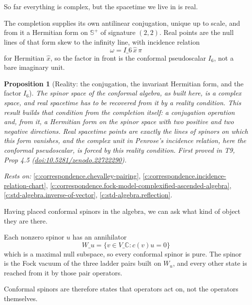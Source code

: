 \documentclass[11pt]{article}
\newtheorem{proposition}[theorem]{Proposition}
\theoremstyle{definition}
\theoremstyle{plain}
\providecommand{\C}{}\renewcommand{\C}{\mathbb{C}}
\providecommand{\CS}{}\renewcommand{\CS}{{\mathbb{S}^{+}}}
\begin{document}
So far everything is complex, but the spacetime we live in is real.

The completion supplies its own antilinear conjugation, unique up to scale, and from it a Hermitian form on $\CS$ of signature $(2,2)$. Real points are the null lines of that form skew to the infinity line, with incidence relation \[ \omega = I\_6\, \hat x\, \pi \] for Hermitian $\hat x$, so the factor in front is the conformal pseudoscalar $I_6$, not a bare imaginary unit.

\begin{proposition}[Reality: the conjugation, the invariant Hermitian form, and the factor $I_6$]\label{c:correspondence.reality-conjugation-twistor-form-factor}
The spinor space of the conformal algebra, as built here, is a complex space, and real spacetime has to be recovered from it by a reality condition. This result builds that condition from the completion itself: a conjugation operation and, from it, a Hermitian form on the spinor space with two positive and two negative directions. Real spacetime points are exactly the lines of spinors on which this form vanishes, and the complex unit in Penrose's incidence relation, here the conformal pseudoscalar, is forced by this reality condition.
\emph{First proved in} T9, Prop 4.5 (\href{https://doi.org/10.5281/zenodo.22722290}{doi:10.5281/zenodo.22722290}).
\end{proposition}
\noindent\emph{Rests on:} \ref{c:correspondence.chevalley-pairing}, \ref{c:correspondence.incidence-relation-chart}, \ref{c:correspondence.fock-model-complexified-ascended-algebra}, \ref{c:std-algebra.inverse-of-vector}, \ref{c:std-algebra.reflection}.

Having placed conformal spinors in the algebra, we can ask what kind of object they are there.

Each nonzero spinor $u$ has an annihilator \[ W\_u = \{ v \in V\_\C : c(v)u = 0 \} \] which is a maximal null subspace, so every conformal spinor is pure. The spinor is the Fock vacuum of the three ladder pairs built on $W_u$, and every other state is reached from it by those pair operators.

Conformal spinors are therefore states that operators act on, not the operators themselves.
\end{document}
